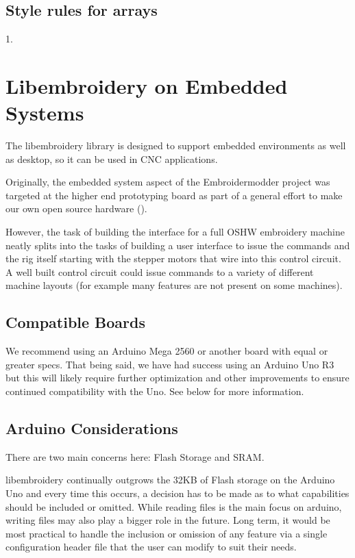 \documentclass[11pt]{report}
\begin{document}
\section{Style rules for arrays}

1.

\chapter{Libembroidery on Embedded Systems}

The libembroidery library is designed to support embedded environments as well
as desktop, so it can be used in CNC applications.

Originally, the embedded system aspect of the Embroidermodder project was
targeted at the higher end  prototyping board as part
of a general effort to make our own open source hardware ().

However, the task of building the interface for a full OSHW embroidery machine
neatly splits into the tasks of building a user interface to issue the
commands and the rig itself starting with the stepper motors that wire into
this control circuit. A well built control circuit could issue commands to
a variety of different machine layouts (for example many features are not
present on some machines).

\section{Compatible Boards}

We recommend using an Arduino Mega 2560 or another board with equal or
greater specs. That being said, we have had success using an Arduino Uno
R3 but this will likely require further optimization and other
improvements to ensure continued compatibility with the Uno. See below
for more information.

\section{Arduino Considerations}

There are two main concerns here: Flash Storage and SRAM.

libembroidery continually outgrows the 32KB of Flash storage on the
Arduino Uno and every time this occurs, a decision has to be made as to
what capabilities should be included or omitted. While reading files is
the main focus on arduino, writing files may also play a bigger role
in the future. Long term, it would be most practical to handle the
inclusion or omission of any feature via a single configuration header
file that the user can modify to suit their needs.
\end{document}
